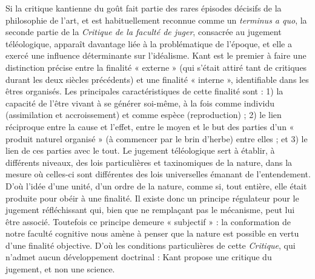 Si la critique kantienne du goût fait partie
des rares épisodes décisifs de la philosophie
de l’art, et est habituellement
reconnue comme un {\it terminus a quo}, la
seconde partie de la {\it Critique de la faculté
de juger}, consacrée au jugement téléologique,
apparaît davantage liée à la problématique
de l’époque, et elle a exercé une
influence déterminante sur l’idéalisme.
Kant est le premier à faire une distinction
précise entre la finalité « externe » (qui
s'était attiré tant de critiques durant les
deux siècles précédents) et une finalité
« interne », identifiable dans les êtres
organisés. Les principales caractéristiques
de cette finalité sont : 1) la capacité de
l'être vivant à se générer soi-même, à la
fois comme individu (assimilation et
accroissement) et comme espèce (reproduction) ;
2) le lien réciproque entre la
cause et l'effet, entre le moyen et le but
des parties d’un « produit naturel organisé »
(à commencer par le brin d’herbe)
entre elles ; et 3) le lien de ces parties avec
le tout. Le jugement téléologique sert à
établir, à différents niveaux, des lois particulières
et taxinomiques de la nature,
dans la mesure où celles-ci sont différentes
des lois universelles émanant de
l'entendement. D'où l’idée d’une unité,
d’un ordre de la nature, comme si, tout
entière, elle était produite pour obéir à
une finalité. Il existe donc un principe
régulateur pour le jugement réfléchissant
qui, bien que ne remplaçant pas le mécanisme,
peut lui être associé. Toutefois ce
principe demeure « subjectif » : la conformation
de notre faculté cognitive nous
amène à penser que la nature est possible
en vertu d’une finalité objective. D'où les
conditions particulières de cette {\it Critique},
qui n’admet aucun développement doctrinal :
Kant propose une critique du jugement,
et non une science.

